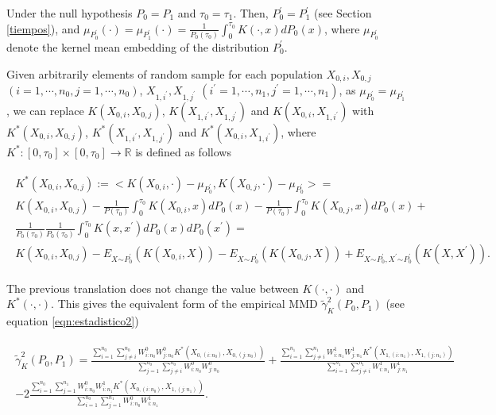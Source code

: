 \documentclass[11pt]{article}
\begin{document}
\begin{appendices}
 Under the null hypothesis $P_0=P_1$ and $\tau_0=\tau_1$. Then, $P_0^{\prime}=P_1^{\prime}$ (see  Section \ref{tiempos}), and   $\mu_{P_0^{\prime}}(\cdot)=\mu_{P_1^{\prime}}(\cdot)= \frac{1}{P_0(\tau_0)}\int_0^{\tau_0} K(\cdot,x) dP_0(x)$, where $\mu_{P_0^{\prime}}$ denote the kernel mean embedding \cite{muandet2017kernel} of the distribution $P_0^{\prime}$. 
 
 
  Given arbitrarily  elements of random sample for each population $X_{0,i},X_{0,j}$ $(i=1,\cdots,n_0,j=1,\cdots,n_0)$,  $X_{1,i^{\prime}},X_{1,j^{\prime}}$ $(i^{\prime}=1,\cdots,n_1,j^{\prime}=1,\cdots,n_1)$,  as $\mu_{P_0^{\prime}}=\mu_{P_1^{\prime}}$, we can replace $K(X_{0,i},X_{0,j})$, $K(X_{1,i^{\prime}},X_{1,j^{\prime}})$ and $K(X_{0,i},X_{1,i^{\prime}})$ with
   $K^{*}(X_{0,i},X_{0,j})$, $K^{*}(X_{1,i^{\prime}},X_{1,j^{\prime}})$ and $K^{*}(X_{0,i},X_{1,i^\prime})$, where  $K^{*}: [0,\tau_0]\times [0,\tau_{0}]\to \mathbb{R}$ is defined as follows
   
   
   \begin{gather}
   \begin{align*}
   K^{*}(X_{0,i},X_{0,j}):= <K(X_{0,i},\cdot)-\mu_{P_0^{\prime}},K(X_{0,j},\cdot)-\mu_{P_0^{\prime}}>=  \\
K(X_{0,i},X_{0,j})-\frac{1}{P(\tau_{0})}\int_{0}^{\tau_0}K(X_{0,i},x)dP_0(x)-\frac{1}{P(\tau_{0})}\int_{0}^{\tau_0}K(X_{0,j},x)dP_0(x)+\\ \frac{1}{P_0(\tau_{0})}\frac{1}{P_0(\tau_{0})}   \int_{0}^{\tau_0}K(x,x^{\prime})dP_0(x)dP_0(x^{\prime})=\\
K(X_{0,i},X_{0,j})-E_{X\sim^{} P_0^{\prime}}(K(X_{0,i},X))-E_{X\sim^{} P_0^{\prime}}(K(X_{0,j},X)) +E_{X\sim^{} P_0^{\prime},X^{\prime}\sim^{} P_0^{\prime}}(K(X,X^{\prime})).		
   \end{align*}
      \end{gather}
   
   The previous translation does not change the value between $K(\cdot,\cdot)$ and $K^{*}(\cdot,\cdot)$. This gives the equivalent form of the empirical MMD $\tilde{\gamma}_K^{2}(P_0,P_1)$  (see equation \ref{eqn:estadistico2})
   
  
  \begin{gather}
  \begin{align}
\tilde{\gamma}_K^{2}(P_0,P_1)=  \frac{\sum_{i=1}^{n_0}  \sum_{j\neq i}^{n_0} W^{0}_{i:n_0} W^{0}_{j:n_0} K^{*}(X_{0,(i:n_0)},X_{0,(j:n_0)})}{ \sum_{j=1}^{n_0} \sum_{j\neq i}^{n_0} W^{0}_{i:n_0} W^{0}_{j:n_0}}+ \frac{\sum_{i=1}^{n_1}  \sum_{j\neq i}^{n_1} W^{1}_{i:n_1} W^{1}_{j:n_1}  K^{*}(X_{1,(i:n_1)},X_{1,(j:n_1)})}{\sum_{i=1}^{n_1}  \sum_{j\neq i }^{n_1}W^{1}_{i:n_1} W^{1}_{j:n_1}}\\-2\frac{\sum_{i=1}^{n_0}  \sum_{j=1}^{n_1} W^{0}_{i:n_0} W^{1}_{i:n_1} K^{*}(X_{0,(i:n_0)},X_{1,(j:n_1)})}{\sum_{i=1}^{n_0}  \sum_{j=1}^{n_1} W^{0}_{i:n_0} W^{1}_{i:n_1}}. \nonumber
  \end{align}
  \end{gather}
  

\end{appendices}
\end{document}
